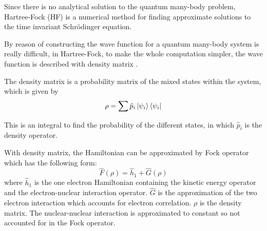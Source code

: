 \documentclass[twoside]{article}
\begin{document}



Since there is no analytical solution to the quantum many-body problem, Hartree-Fock (HF) is a numerical method for finding approximate solutions to the time invariant Schr\"{o}dinger equation. 


By reason of constructing the wave function for a quantum many-body system is really difficult, in Hartree-Fock, to make the whole computation simpler, the wave function is described with density matrix . 



The density matrix is a probability matrix of the mixed states within the system, which is given by
\[
\rho = \sum\hat{p}_i\ket{\psi_i}\bra{\psi_i}
\]


This is an integral to find the probability of the different states, in which $\hat{p}_i$ is the density operator. 

With density matrix, the Hamiltonian can be approximated by Fock operator which has the following form:
\[
\hat{F}(\rho) = \hat{h}_1 + \hat{G}(\rho)
\]
where $\hat{h}_1$ is the one electron Hamiltonian containing the kinetic energy operator and the electron-nuclear interaction operator. $\hat{G}$ is the approximation of the two electron interaction which accounts for electron correlation. $\rho$ is the density matrix. The nuclear-nuclear interaction is approximated to constant so not accounted for in the Fock operator. %
\end{document}
